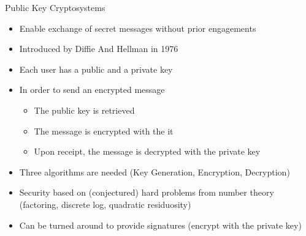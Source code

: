 \documentclass{beamer}
\begin{document}
\begin{frame}{Public Key Cryptosystems}
\begin{itemize}
\item Enable exchange of secret messages without prior engagements
\item Introduced by Diffie And Hellman in 1976
\item Each user has a public and a private key
\item In order to send an encrypted message
\begin{itemize}
\item The public key is retrieved
\item The message is encrypted with the it
\item Upon receipt, the message is decrypted with the private key
\end{itemize}
\item Three algorithms are needed (Key Generation, Encryption, Decryption)
\item Security based on (conjectured) hard problems from number theory (factoring, discrete log, quadratic residuosity)
\item Can be turned around to provide signatures (encrypt with the private key)
\end{itemize}
\end{frame}
\end{document}
